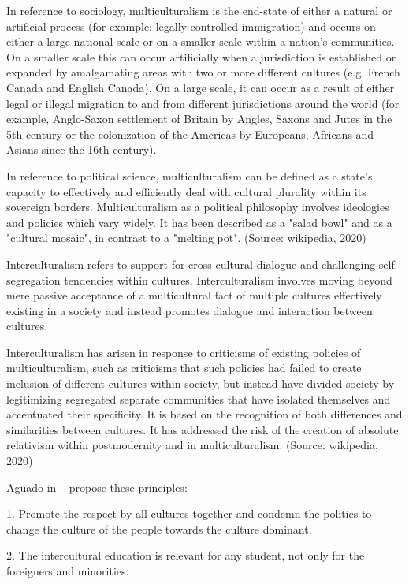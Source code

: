 \documentclass[fleqn,10pt,lineno]{wlpeerj} %
\begin{document}
In reference to sociology, multiculturalism is the end-state of either
a natural or artificial process (for example: legally-controlled
immigration) and occurs on either a large national scale or on a
smaller scale within a nation's communities. On a smaller scale this
can occur artificially when a jurisdiction is established or expanded
by amalgamating areas with two or more different cultures (e.g. French
Canada and English Canada). On a large scale, it can occur as a result
of either legal or illegal migration to and from different
jurisdictions around the world (for example, Anglo-Saxon settlement of
Britain by Angles, Saxons and Jutes in the 5th century or the
colonization of the Americas by Europeans, Africans and Asians since
the 16th century).

In reference to political science, multiculturalism can be defined as
a state's capacity to effectively and efficiently deal with cultural
plurality within its sovereign borders. Multiculturalism as a
political philosophy involves ideologies and policies which vary
widely. It has been described as a "salad bowl" and as a "cultural
mosaic", in contrast to a "melting pot". (Source: wikipedia, 2020)

Interculturalism refers to support for cross-cultural dialogue and
challenging self-segregation tendencies within cultures.
Interculturalism involves moving beyond mere passive acceptance of a
multicultural fact of multiple cultures effectively existing in a
society and instead promotes dialogue and interaction between
cultures.

Interculturalism has arisen in response to criticisms of existing
policies of multiculturalism, such as criticisms that such policies
had failed to create inclusion of different cultures within society,
but instead have divided society by legitimizing segregated separate
communities that have isolated themselves and accentuated their
specificity. It is based on the recognition of both differences and
similarities between cultures. It has addressed the risk of the
creation of absolute relativism within postmodernity and in
multiculturalism. (Source: wikipedia, 2020)

Aguado in ~\cite{odina1991educacion} propose these principles:

1. Promote the respect by all cultures together and condemn the
politics to change the culture of the people towards the culture
dominant. 

2. The intercultural education is relevant for any student, not only
for the foreigners and minorities.
\end{document}
